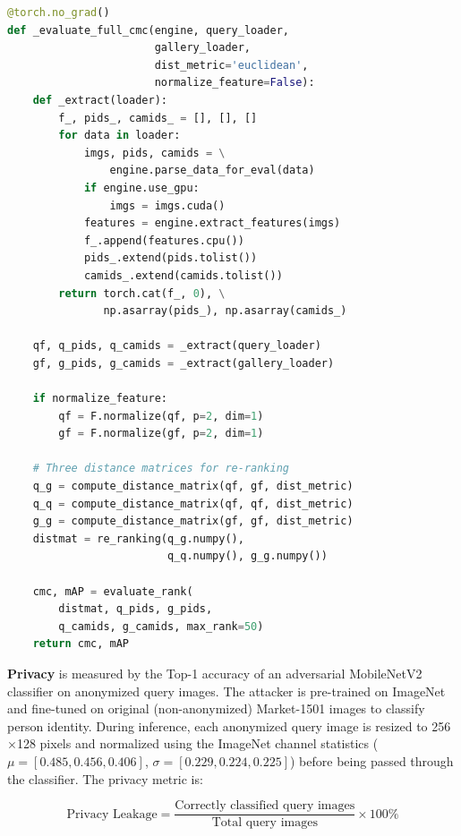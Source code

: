 \begin{lstlisting}[language=Python, caption={Utility evaluation with k-reciprocal re-ranking (\texttt{evaluate\_utility.py}).}, label=lst:utility_eval]
@torch.no_grad()
def _evaluate_full_cmc(engine, query_loader,
                       gallery_loader,
                       dist_metric='euclidean',
                       normalize_feature=False):
    def _extract(loader):
        f_, pids_, camids_ = [], [], []
        for data in loader:
            imgs, pids, camids = \
                engine.parse_data_for_eval(data)
            if engine.use_gpu:
                imgs = imgs.cuda()
            features = engine.extract_features(imgs)
            f_.append(features.cpu())
            pids_.extend(pids.tolist())
            camids_.extend(camids.tolist())
        return torch.cat(f_, 0), \
               np.asarray(pids_), np.asarray(camids_)

    qf, q_pids, q_camids = _extract(query_loader)
    gf, g_pids, g_camids = _extract(gallery_loader)

    if normalize_feature:
        qf = F.normalize(qf, p=2, dim=1)
        gf = F.normalize(gf, p=2, dim=1)

    # Three distance matrices for re-ranking
    q_g = compute_distance_matrix(qf, gf, dist_metric)
    q_q = compute_distance_matrix(qf, qf, dist_metric)
    g_g = compute_distance_matrix(gf, gf, dist_metric)
    distmat = re_ranking(q_g.numpy(),
                         q_q.numpy(), g_g.numpy())

    cmc, mAP = evaluate_rank(
        distmat, q_pids, g_pids,
        q_camids, g_camids, max_rank=50)
    return cmc, mAP
\end{lstlisting}

\textbf{Privacy} is measured by the Top-1 accuracy of an adversarial MobileNetV2 \cite{sandler2018mobilenetv2} classifier on anonymized query images. The attacker is pre-trained on ImageNet \cite{deng2009imagenet} and fine-tuned on original (non-anonymized) Market-1501 images to classify person identity. During inference, each anonymized query image is resized to 256$\times$128 pixels and normalized using the ImageNet channel statistics ($\mu = [0.485, 0.456, 0.406]$, $\sigma = [0.229, 0.224, 0.225]$) before being passed through the classifier. The privacy metric is:

\begin{equation}
    \text{Privacy Leakage} = \frac{\text{Correctly classified query images}}{\text{Total query images}} \times 100\%
    \label{eq:privacy_leak}
\end{equation}

